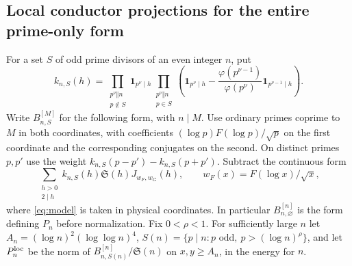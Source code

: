 \documentclass[11pt,a4paper]{article}
\numberwithin{equation}{section}
\newcommand{\SSS}{\mathfrak S}
\begin{document}
\subsection{Local conductor projections for the entire prime-only form}

For a set $S$ of odd prime divisors of an even integer $n$, put
\[
 k_{n,S}(h)=
 \prod_{\substack{p^\nu\Vert n\\p\notin S}}\mathbf1_{p^\nu\mid h}
 \prod_{\substack{p^\nu\Vert n\\p\in S}}
 \left(\mathbf1_{p^\nu\mid h}
 -\frac{\varphi(p^{\nu-1})}{\varphi(p^\nu)}
                    \mathbf1_{p^{\nu-1}\mid h}\right).
\]
Write $B_{n,S}^{[M]}$ for the following form, with $n\mid M$.
Use ordinary primes coprime to $M$ in both coordinates, with
coefficients $(\log p)F(\log p)/\sqrt p$ on the first coordinate
and the corresponding conjugates on the second. On distinct
primes $p,p'$ use the weight $k_{n,S}(p-p')-k_{n,S}(p+p')$.
Subtract the continuous form
\[
 \sum_{\substack{h>0\\2\mid h}}
       k_{n,S}(h)\SSS(h) J_{w_F,w_G}(h),
 \qquad w_F(x)=F(\log x)/\sqrt x ,
\]
where \eqref{eq:model} is taken in physical coordinates. In
particular $B_{n,\varnothing}^{[n]}$ is the form defining $P_n$
before normalization. Fix $0<\rho<1$. For sufficiently large $n$
let $A_n=(\log n)^2(\log\log n)^4$, $S(n)=\{p\mid n:p \text{ odd},
\ p>(\log n)^\rho\}$, and let $P_n^{\rm loc}$ be the norm of
$B_{n,S(n)}^{[n]}/\SSS(n)$ on $x,y\ge A_n$, in the energy for $n$.
\end{document}
